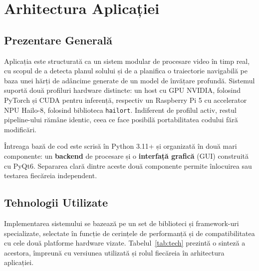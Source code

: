 \chapter{Arhitectura Aplicației}
\label{chap:ch4}

\section{Prezentare Generală}

Aplicația este structurată ca un sistem modular de procesare video în timp real, cu scopul de a detecta planul solului și de a planifica o traiectorie navigabilă pe baza unei hărți de adâncime generate de un model de învățare profundă. Sistemul suportă două profiluri hardware distincte: un host cu GPU NVIDIA, folosind PyTorch și CUDA pentru inferență, respectiv un Raspberry Pi 5 cu accelerator NPU Hailo-8, folosind biblioteca \texttt{hailort}. Indiferent de profilul activ, restul pipeline-ului rămâne identic, ceea ce face posibilă portabilitatea codului fără modificări.

Întreaga bază de cod este scrisă în Python 3.11+ și organizată în două mari componente: un \textbf{backend} de procesare și o \textbf{interfață grafică} (GUI) construită cu PyQt6. Separarea clară dintre aceste două componente permite înlocuirea sau testarea fiecăreia independent.

\section{Tehnologii Utilizate}

Implementarea sistemului se bazează pe un set de biblioteci și framework-uri specializate, selectate în funcție de cerințele de performanță și de compatibilitatea cu cele două platforme hardware vizate. Tabelul~\ref{tab:tech} prezintă o sinteză a acestora, împreună cu versiunea utilizată și rolul fiecăreia în arhitectura aplicației.

